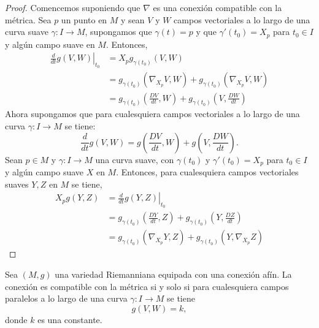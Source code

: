 \begin{proof}
	Comencemos suponiendo que $\nabla$ es una conexión compatible con la métrica. Sea $p$ un punto en $M$ y sean $V$ y $W$ campos vectoriales a lo largo de una curva suave $\gamma: I \to M$, supongamos que $\gamma(t) = p$ y que $\gamma'(t_{0}) = X_{p}$ para $t_{0} \in I$ y algún campo suave en $M$. Entonces,
	\begin{align*}
		\left. \frac{d}{dt} g(V,W) \right|_{t_{0}}
		 & = X_{p} g_{\gamma(t_{0})} (V , W)                                                                  \\
		 & = g_{\gamma(t_{0})} (\nabla_{X_{p}}V, W) + g_{\gamma(t_{0})} (\nabla_{X_{p}}V,W)                   \\
		 & = g_{\gamma(t_{0})} \left(\frac{DV}{dt}, W\right) +g_{\gamma(t_{0})} \left(V, \frac{DW}{dt}\right)
	\end{align*}
	Ahora supongamos que para cualesquiera campos vectoriales a lo largo de una curva $\gamma: I \to M$ se tiene:
	\[
		\frac{d}{dt}g(V,W) = g\left(\frac{DV}{dt},W \right) +g\left(V, \frac{DW}{dt} \right).
	\]
	Sean $p \in M$ y $\gamma: I \to M$ una curva suave, con $\gamma(t_{0})$ y $\gamma'(t_{0}) = X_{p}$ para $t_{0} \in I$ y algún campo suave $X$ en $M$. Entonces, para cualesquiera campos vectoriales suaves $Y,Z$ en $M$ se tiene,
	\begin{align*}
		X_{p} g(Y,Z) & = \left. \frac{d}{dt} g(Y,Z) \right|_{t_{0}}       \\
		             & = g_{\gamma(t_{0})} \left( \frac{DY}{dt}, Z\right)
		+ g_{\gamma(t_{0})} \left( Y, \frac{DZ}{dt}\right)                \\
		             & = g_{\gamma(t_0)}(\nabla_{X_{p}}Y, Z)
		+ g_{\gamma(t_0)}(Y, \nabla_{X_{p}}Z)
	\end{align*}
\end{proof}

\begin{lemma}
	Sea $(M,g)$ una variedad Riemanniana equipada con una conexión afín. La conexión es compatible con la métrica si y solo si para cualesquiera campos paralelos a lo largo de una curva $\gamma: I \to M$ se tiene
	\[
		g(V,W) = k,
	\]
	donde $k$ es una constante.
\end{lemma}

